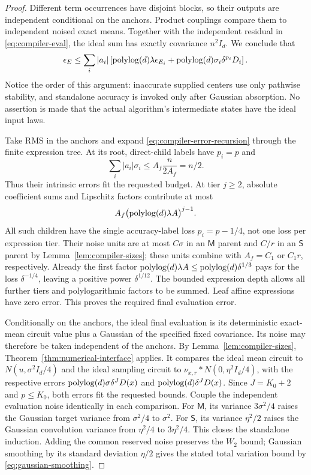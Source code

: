 \begin{proof}
Different term occurrences have disjoint blocks, so their outputs
are independent conditional on the anchors.  Product couplings
compare them to independent noised exact means.  Together with the
independent residual in \eqref{eq:compiler-eval}, the ideal sum
has exactly covariance $n^2I_d$.  We conclude that
\begin{equation}
 \epsilon_E\le\sum_i|a_i|
 \left[\operatorname{polylog}(d)\lambda\epsilon_{E_i}
       +\operatorname{polylog}(d)\sigma_i\delta^{p_i}D_i\right].
 \label{eq:compiler-error-recursion}
\end{equation}
Notice the order of this argument: inaccurate supplied centers use
only pathwise stability, and standalone accuracy is invoked only
after Gaussian absorption.  No assertion is made that the actual
algorithm's intermediate states have the ideal input laws.

Take RMS in the anchors and expand
\eqref{eq:compiler-error-recursion} through the finite expression
tree.  At its root, direct-child labels have $p_i=p$ and
\[
 \sum_i|a_i|\sigma_i
 \le A_f\frac{n}{2A_f}=n/2.
\]
Thus their intrinsic errors fit the requested budget.  At tier
$j\ge2$, absolute coefficient sums and Lipschitz factors contribute
at most
\[
 A_f\bigl(\operatorname{polylog}(d)\lambda A\bigr)^{j-1}.
\]
All such children have the single accuracy-label loss $p_i=p-1/4$,
not one loss per expression tier.  Their noise units are at most
$C\sigma$ in an $\mathsf M$ parent and $C/r$ in an
$\mathsf S$ parent by Lemma~\ref{lem:compiler-sizes}; these units
combine with $A_f=C_1$ or $C_1r$, respectively.
Already the first factor
$\operatorname{polylog}(d)\lambda A\le\operatorname{polylog}(d)\delta^{1/3}$
pays for the loss $\delta^{-1/4}$, leaving a positive power
$\delta^{1/12}$.  The bounded expression depth allows all further
tiers and polylogarithmic factors to be summed.  Leaf affine
expressions have zero error.  This proves the required final
evaluation error.

Conditionally on the anchors, the ideal final evaluation is its
deterministic exact-mean circuit value plus a Gaussian of the
specified fixed covariance.  Its noise may therefore be taken
independent of the anchors.  By Lemma~\ref{lem:compiler-sizes},
Theorem~\ref{thm:numerical-interface} applies.  It compares the ideal mean
circuit to $N(u,\sigma^2I_d/4)$ and the ideal sampling circuit to
$\nu_{x,r}*N(0,\eta^2I_d/4)$, with the respective errors
$\operatorname{polylog}(d)\sigma\delta^JD(x)$ and
$\operatorname{polylog}(d)\delta^JD(x)$.  Since $J=K_0+2$ and $p\le K_0$,
both errors fit the requested bounds.
Couple the independent evaluation noise identically in each comparison.
For $\mathsf M$, its variance $3\sigma^2/4$ raises the Gaussian
target variance from $\sigma^2/4$ to $\sigma^2$.
For $\mathsf S$, its variance $\eta^2/2$ raises the Gaussian
convolution variance from $\eta^2/4$ to $3\eta^2/4$.
This closes the standalone induction.  Adding the common reserved
noise preserves the $W_2$ bound; Gaussian smoothing by its standard
deviation $\eta/2$ gives the stated total variation bound by
\eqref{eq:gaussian-smoothing}.
\end{proof}


